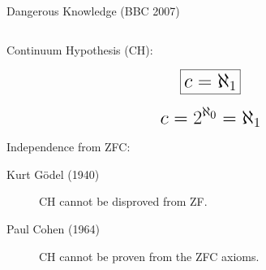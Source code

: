 \begin{frame}{}
  \centerline{\Large Dangerous Knowledge (BBC 2007)}

  \vspace{0.30cm}
  \begin{columns}
  \end{columns}
\end{frame}

\begin{frame}{}
  Continuum Hypothesis (CH):

  \[
    \fbox{\text{\LARGE $c = \aleph_{1}$}}
  \]

  \pause
  \[
    \text{\LARGE $c = 2^{\aleph_0} = \aleph_1$}
  \]

  \pause
  \vspace{0.60cm}
  \centerline{\leftpointright\; }

  \pause
  \vspace{0.80cm}
  Independence from ZFC: \\[1pt]
  \begin{description}
    \item[Kurt G\"odel (1940)] CH cannot be disproved from ZF.
    \item[Paul Cohen (1964)] CH cannot be proven from the ZFC axioms.
  \end{description}
\end{frame}
